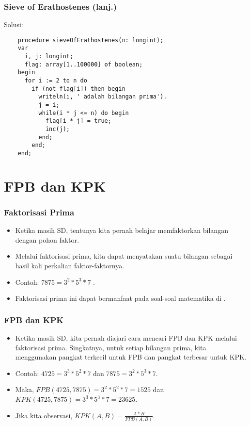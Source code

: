 \begin{frame}[fragile]
\frametitle{Sieve of Erathostenes (lanj.)}
Solusi:
  \begin{lstlisting}
    procedure sieveOfErathostenes(n: longint);
    var
      i, j: longint;
      flag: array[1..100000] of boolean;
    begin
      for i := 2 to n do 
        if (not flag[i]) then begin
          writeln(i, ' adalah bilangan prima').
          j = i;
          while(i * j <= n) do begin
            flag[i * j] = true;
            inc(j);
          end;
        end;
    end;  
  \end{lstlisting}
\end{frame}

\section{FPB dan KPK}
\frame{\sectionpage}

\begin{frame}
\frametitle{Faktorisasi Prima}
\begin{itemize}
  \item Ketika masih SD, tentunya kita pernah belajar memfaktorkan bilangan dengan pohon faktor.
  \item Melalui faktorisasi prima, kita dapat menyatakan suatu bilangan sebagai hasil kali perkalian faktor-faktornya.
  \item Contoh: $7875 = 3^{2} * 5^{3} * 7$ .
  \item Faktorisasi prima ini dapat bermanfaat pada soal-soal matematika di .
\end{itemize}
\end{frame}

\begin{frame}
\frametitle{FPB dan KPK}
\begin{itemize}
  \item Ketika masih SD, kita pernah diajari cara mencari FPB dan KPK melalui faktorisasi prima. Singkatnya, untuk setiap bilangan prima, kita menggunakan pangkat terkecil untuk FPB dan pangkat terbesar untuk KPK.
  \item Contoh: $4725 = 3^{3} * 5^{2} * 7$ dan $7875 = 3^{2} * 5^{3} * 7$.
  \item Maka, $FPB(4725,7875) = 3^{2} * 5^{2} * 7 = 1525$ dan $KPK(4725,7875) = 3^{3} * 5^{3} * 7 = 23625$.
  \item Jika kita observasi, $KPK(A,B) = \frac{A * B}{FPB(A,B)}$. 
\end{itemize}
\end{frame}

